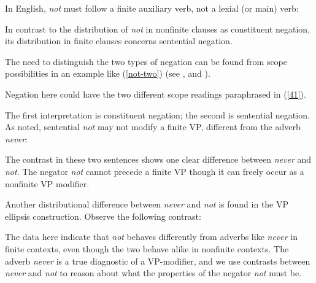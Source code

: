 \documentclass[output=paper
                ,modfonts
		,nonflat
	        ,collection
	        ,collectionchapter
	        ,collectiontoclongg
 	        ,biblatex  
                ,babelshorthands
                ,newtxmath
                ,draftmode
                ,colorlinks, citecolor=brown 
]{./langsci/langscibook}
\begin{document}
{\begin{exe}
\begin{xlist}
\begin{exe}
\begin{xlist}
\eal
{}
\zl
\noindent
In English, \textit{not} must follow a finite
auxiliary verb, not a lexial (or main) verb:

\eal
{}
\zl

In contrast to the distribution of \textit{not}
 in nonfinite clauses as constituent negation, its distribution
 in finite clauses concerns sentential
 negation.
 
  The need to distinguish the two types of negation can be found from scope
possibilities in an example like (\ref{not-two}) (see \citep{Klima:64, Baker:89}, and \citep{Warner2000a-u}).

\z
%
Negation here could have the two different scope readings
paraphrased in (\ref{41}).


\eal\label{41}
\zl
%
The first interpretation is constituent negation; the second is
sentential negation. As noted, sentential \emph{not} may not modify a finite
VP, different from the adverb \textit{never}:



\eal
{}
\zl
%
The contrast in these two sentences
shows one clear difference between \emph{never}
and \emph{not}. The negator \emph{not} cannot
precede a finite VP though it can freely occur
as a nonfinite VP modifier.
%
%
%
%

Another distributional difference between \emph{never} and \emph{not} is found in
the VP ellipsis construction.  Observe the following
contrast:

\eal
\label{vpe-not-ex}
\zl
%
\noindent The data here indicate that \emph{not} behaves differently from
adverbs like \emph{never} in finite contexts, even though the two
behave alike in nonfinite contexts. The adverb \emph{never} is a true
diagnostic of a VP-modifier, and we use contrasts between \emph{never} and \emph{not} to reason about what the properties of
the negator \emph{not} must be.


\end{xlist}
\end{exe}
\end{xlist}
\end{exe}}
\end{document}
